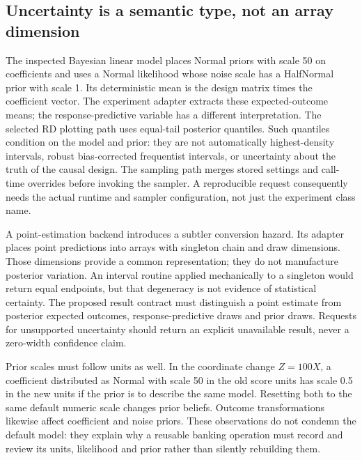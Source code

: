 \subsection{Uncertainty is a semantic type, not an array dimension}

The inspected Bayesian linear model places Normal priors with scale 50 on
coefficients and uses a Normal likelihood whose noise scale has a HalfNormal
prior with scale 1. Its deterministic mean is the design matrix times the
coefficient vector. The experiment adapter extracts these expected-outcome means;
the response-predictive variable has a different interpretation. The selected RD
plotting path uses equal-tail posterior quantiles. Such quantiles condition on the
model and prior: they are not automatically highest-density intervals, robust
bias-corrected frequentist intervals, or uncertainty about the truth of the causal
design. The sampling path merges stored settings and call-time overrides before
invoking the sampler. A reproducible request consequently needs the actual runtime
and sampler configuration, not just the experiment class name.
\citep{exec14_causalpy_primary}

A point-estimation backend introduces a subtler conversion hazard. Its adapter
places point predictions into arrays with singleton chain and draw dimensions.
Those dimensions provide a common representation; they do not manufacture
posterior variation. An interval routine applied mechanically to a singleton
would return equal endpoints, but that degeneracy is not evidence of statistical
certainty. The proposed result contract must distinguish a point estimate from
posterior expected outcomes, response-predictive draws and prior draws. Requests
for unsupported uncertainty should return an explicit unavailable result, never
a zero-width confidence claim.~\citep{exec14_causalpy_primary,exec14_causalpy_decision}

Prior scales must follow units as well. In the coordinate change $Z=100X$, a
coefficient distributed as Normal with scale 50 in the old score units has scale
0.5 in the new units if the prior is to describe the same model. Resetting both
to the same default numeric scale changes prior beliefs. Outcome transformations
likewise affect coefficient and noise priors. These observations do not condemn
the default model: they explain why a reusable banking operation must record and
review its units, likelihood and prior rather than silently rebuilding them.
\citep{exec14_causalpy_primary,exec14_causalpy_exact}

